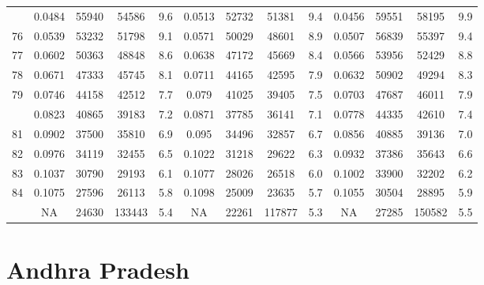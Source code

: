 \documentclass[
  14pt,
]{article}
\begin{document}
\begin{longtable}[t]{lcccccccccccc}
\addlinespace
75 & 0.0484 & 55940 & 54586 & 9.6 & 0.0513 & 52732 & 51381 & 9.4 & 0.0456 & 59551 & 58195 & 9.9\\
76 & 0.0539 & 53232 & 51798 & 9.1 & 0.0571 & 50029 & 48601 & 8.9 & 0.0507 & 56839 & 55397 & 9.4\\
77 & 0.0602 & 50363 & 48848 & 8.6 & 0.0638 & 47172 & 45669 & 8.4 & 0.0566 & 53956 & 52429 & 8.8\\
78 & 0.0671 & 47333 & 45745 & 8.1 & 0.0711 & 44165 & 42595 & 7.9 & 0.0632 & 50902 & 49294 & 8.3\\
79 & 0.0746 & 44158 & 42512 & 7.7 & 0.079 & 41025 & 39405 & 7.5 & 0.0703 & 47687 & 46011 & 7.9\\
\addlinespace
80 & 0.0823 & 40865 & 39183 & 7.2 & 0.0871 & 37785 & 36141 & 7.1 & 0.0778 & 44335 & 42610 & 7.4\\
81 & 0.0902 & 37500 & 35810 & 6.9 & 0.095 & 34496 & 32857 & 6.7 & 0.0856 & 40885 & 39136 & 7.0\\
82 & 0.0976 & 34119 & 32455 & 6.5 & 0.1022 & 31218 & 29622 & 6.3 & 0.0932 & 37386 & 35643 & 6.6\\
83 & 0.1037 & 30790 & 29193 & 6.1 & 0.1077 & 28026 & 26518 & 6.0 & 0.1002 & 33900 & 32202 & 6.2\\
84 & 0.1075 & 27596 & 26113 & 5.8 & 0.1098 & 25009 & 23635 & 5.7 & 0.1055 & 30504 & 28895 & 5.9\\
\addlinespace
85 & NA & 24630 & 133443 & 5.4 & NA & 22261 & 117877 & 5.3 & NA & 27285 & 150582 & 5.5\\*
\end{longtable}

\pagebreak

\hypertarget{andhra-pradesh}{%
\section{Andhra Pradesh}\label{andhra-pradesh}}
\end{document}
